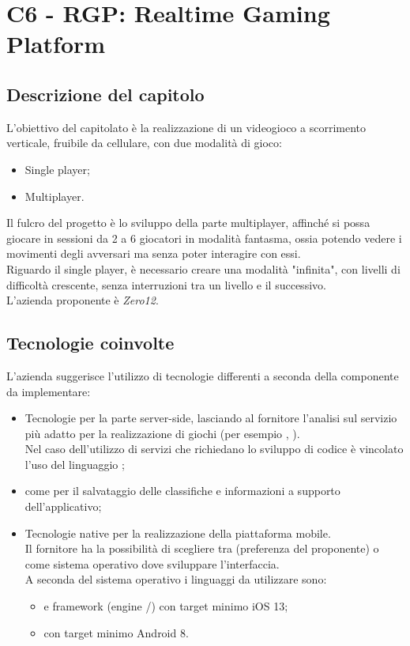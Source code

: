 \section{C6 - RGP: Realtime Gaming Platform}

\subsection{Descrizione del capitolo}
L'obiettivo del capitolato è la realizzazione di un videogioco a scorrimento verticale, fruibile da cellulare, con due modalità di gioco:
\begin{itemize}
\item Single player;
\item Multiplayer.
\end{itemize}  
Il fulcro del progetto è lo sviluppo della parte multiplayer, affinché si possa giocare in sessioni da 2 a 6 giocatori in modalità fantasma, ossia potendo vedere i movimenti degli avversari ma senza poter interagire con essi.\\
Riguardo il single player, è necessario creare una modalità "infinita", con livelli di difficoltà crescente, senza interruzioni tra un livello e il successivo.\\
L'azienda proponente è \textit{Zero12}. 

\subsection{Tecnologie coinvolte}
L'azienda suggerisce l'utilizzo di tecnologie differenti a seconda della componente da implementare:
\begin{itemize}
\item Tecnologie  per la parte server-side, lasciando al fornitore l'analisi sul servizio più adatto per la realizzazione di giochi  (per esempio , ). \\
Nel caso dell'utilizzo di servizi che richiedano lo sviluppo di codice è vincolato l'uso del linguaggio ;
\item {} come   per il salvataggio delle classifiche e informazioni a supporto dell'applicativo; 
\item Tecnologie native per la realizzazione della piattaforma mobile. \\ 
Il fornitore ha la possibilità di scegliere tra  (preferenza del proponente) o  come sistema operativo dove sviluppare l'interfaccia. \\
A seconda del sistema operativo i linguaggi da utilizzare sono:
\begin{itemize}
\item {} e framework  (engine /) con target minimo iOS 13;
\item {} con target minimo Android 8.
\end{itemize}
\end{itemize}

